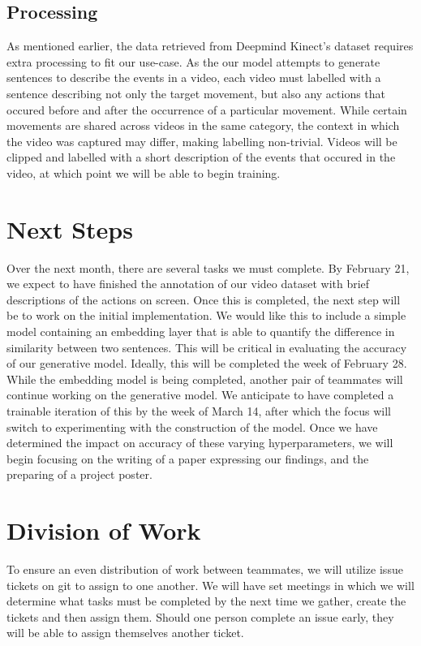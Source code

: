 \documentclass[11pt]{article}
\begin{document}
\subsection{Processing}
As mentioned earlier, the data retrieved from Deepmind Kinect's dataset requires extra processing to fit our use-case.
As the our model attempts to generate sentences to describe
the events in a video, each video must labelled with a sentence describing not only the target movement, but also
any actions that occured before and after the occurrence of a particular movement. While certain movements are shared
across videos in the same category, the context in which the video was captured may differ, making labelling non-trivial.
Videos will be clipped and labelled with a short description of the events that occured in the video, at which point we will be able
to begin training.

\section{Next Steps}
Over the next month, there are several tasks we must complete. By February 21, we expect to have finished the annotation of our video 
dataset with brief descriptions of the actions on screen. Once this is completed, the next step will be to work on the initial implementation. 
We would like this to include a simple model containing an embedding layer that is able to quantify the difference in similarity between 
two sentences. This will be critical in evaluating the accuracy of our generative model. Ideally, this will be completed the week of February 28. 
While the embedding model is being completed, another pair of teammates will continue working on the generative model. We anticipate to have completed 
a trainable iteration of this by the week of March 14, after which the focus will switch to experimenting with the construction of the model. Once we 
have determined the impact on accuracy of these varying hyperparameters, we will begin focusing on the writing of a paper expressing our findings, and the 
preparing of a project poster.

\section{Division of Work}
To ensure an even distribution of work between teammates, we will utilize issue tickets on git to assign to one another. We will have set meetings in which 
we will determine what tasks must be completed by the next time we gather, create the tickets and then assign them. Should one person complete an issue early, 
they will be able to assign themselves another ticket.
\end{document}
